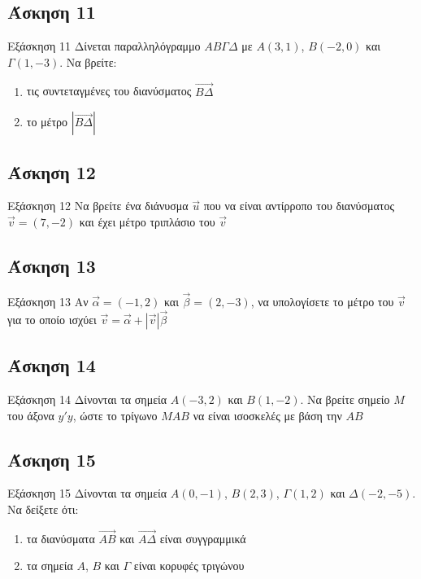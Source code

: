 \documentclass[greek]{beamer}
\begin{document}
\subsection{Άσκηση 11}
\begin{frame}[label=Άσκηση11,t]{Εξάσκηση 11}
      Δίνεται παραλληλόγραμμο $ΑΒΓΔ$ με $Α(3,1)$, $Β(-2,0)$ και $Γ(1,-3)$. Να βρείτε:
      \begin{enumerate}
            \item<1-> τις συντεταγμένες του διανύσματος $\overrightarrow{ΒΔ}$
            \item<2-> το μέτρο $|\overrightarrow{ΒΔ}|$
      \end{enumerate}
\end{frame}

\subsection{Άσκηση 12}
\begin{frame}[label=Άσκηση12,t]{Εξάσκηση 12}
      Να βρείτε ένα διάνυσμα $\vec{u}$ που να είναι αντίρροπο του διανύσματος $\vec{v}=(7,-2)$ και έχει μέτρο τριπλάσιο του $\vec{v}$
\end{frame}

\subsection{Άσκηση 13}
\begin{frame}[label=Άσκηση13,t]{Εξάσκηση 13}
      Αν $\vec{α}=(-1,2)$ και $\vec{β}=(2,-3)$, να υπολογίσετε το μέτρο του $\vec{v}$ για το οποίο ισχύει $\vec{v}=\vec{α}+|\vec{v}|\vec{β}$
\end{frame}

\subsection{Άσκηση 14}
\begin{frame}[label=Άσκηση14,t]{Εξάσκηση 14}
      Δίνονται τα σημεία $Α(-3,2)$ και $Β(1,-2)$. Να βρείτε σημείο $Μ$ του άξονα $y'y$, ώστε το τρίγωνο $ΜΑΒ$ να είναι ισοσκελές με βάση την $ΑΒ$
\end{frame}

\subsection{Άσκηση 15}
\begin{frame}[label=Άσκηση15,t]{Εξάσκηση 15}
      Δίνονται τα σημεία $Α(0,-1)$, $Β(2,3)$, $Γ(1,2)$ και $Δ(-2,-5)$. Να δείξετε ότι:
      \begin{enumerate}
            \item<1-> τα διανύσματα $\overrightarrow{ΑΒ}$ και $\overrightarrow{ΑΔ}$ είναι συγγραμμικά
            \item<2-> τα σημεία $Α$, $Β$ και $Γ$ είναι κορυφές τριγώνου
      \end{enumerate}
\end{frame}
\end{document}
